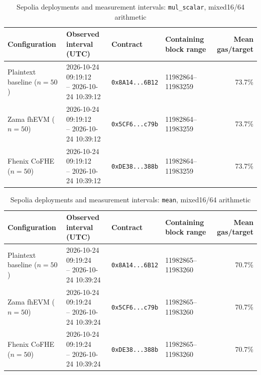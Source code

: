 \begin{table}[!t]
\caption{Sepolia deployments and measurement intervals: \texttt{mul\_scalar}, mixed16/64 arithmetic}
\label{tab:sepolia-experiment-deployments-reference-mixed-oct24-mul-scalar}
\centering
\footnotesize
\setlength{\tabcolsep}{4pt}
\begin{tabular}{|l|l|l|l|r|}
\hline
\textbf{Configuration} &
\textbf{Observed interval (UTC)} &
\textbf{Contract} &
\textbf{Containing block range} &
\textbf{Mean gas/target} \\
\hline
Plaintext baseline (\(n=50\)) &
\shortstack[l]{2026-10-24 09:19:12 \\ -- 2026-10-24 10:39:12} &
\texttt{0x8A14...6B12} &
11982864--11983259 &
73.7\% \\
\hline
Zama fhEVM (\(n=50\)) &
\shortstack[l]{2026-10-24 09:19:12 \\ -- 2026-10-24 10:39:12} &
\texttt{0x5CF6...c79b} &
11982864--11983259 &
73.7\% \\
\hline
Fhenix CoFHE (\(n=50\)) &
\shortstack[l]{2026-10-24 09:19:12 \\ -- 2026-10-24 10:39:12} &
\texttt{0xDE38...388b} &
11982864--11983259 &
73.7\% \\
\hline
\end{tabular}
\end{table}

\begin{table}[!t]
\caption{Sepolia deployments and measurement intervals: \texttt{mean}, mixed16/64 arithmetic}
\label{tab:sepolia-experiment-deployments-reference-mixed-oct24-mean}
\centering
\footnotesize
\setlength{\tabcolsep}{4pt}
\begin{tabular}{|l|l|l|l|r|}
\hline
\textbf{Configuration} &
\textbf{Observed interval (UTC)} &
\textbf{Contract} &
\textbf{Containing block range} &
\textbf{Mean gas/target} \\
\hline
Plaintext baseline (\(n=50\)) &
\shortstack[l]{2026-10-24 09:19:24 \\ -- 2026-10-24 10:39:24} &
\texttt{0x8A14...6B12} &
11982865--11983260 &
70.7\% \\
\hline
Zama fhEVM (\(n=50\)) &
\shortstack[l]{2026-10-24 09:19:24 \\ -- 2026-10-24 10:39:24} &
\texttt{0x5CF6...c79b} &
11982865--11983260 &
70.7\% \\
\hline
Fhenix CoFHE (\(n=50\)) &
\shortstack[l]{2026-10-24 09:19:24 \\ -- 2026-10-24 10:39:24} &
\texttt{0xDE38...388b} &
11982865--11983260 &
70.7\% \\
\hline
\end{tabular}
\end{table}

